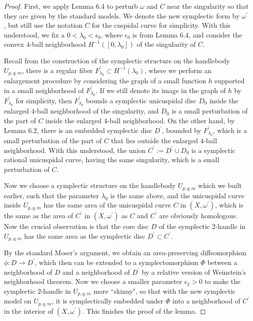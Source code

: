 \documentclass[11pt]{amsart}
\theoremstyle{plain}
\numberwithin{theorem}{section}
\theoremstyle{definition}
\begin{document}
\begin{proof}
First, we apply Lemma 6.4 to perturb $\omega$ and $C$ near the singularity so that they are given by the standard models. We denote the new symplectic form by $\omega^\prime$, but still use the notation $C$ for the cuspidal curve for simplicity. With this understood, we fix a $0<\lambda_0<\epsilon_0$, where $\epsilon_0$ is from 
Lemma 6.4, and consider the convex $4$-ball neighborhood $H^{-1}([0,\lambda_0])$ of the singularity of $C$. 

Recall from the construction of the symplectic structure on the handlebody $U_{p,q,m}$, there is a regular fiber
$F^\prime_{\lambda_0}\subset H^{-1}(\lambda_0)$, where we perform an enlargement procedure by considering
the graph of a small function $h$ supported in a small neighborhood of $F^\prime_{\lambda_0}$. If we still denote
its image in the graph of $h$ by $F^\prime_{\lambda_0}$ for simplicity, then $F^\prime_{\lambda_0}$ bounds a
symplectic unicuspidal disc $D_0$ inside the enlarged $4$-ball neighborhood of the singularity, and $D_0$ is a small perturbation of the part of $C$ inside the enlarged $4$-ball neighborhood. On the other hand, by Lemma 6.2,
there is an embedded symplectic disc $D^\prime$, bounded by $F^\prime_{\lambda_0}$, which is a small perturbation of the part of $C$ that lies outside the enlarged $4$-ball neighborhood. With this understood, the union $C^\prime:=D^\prime\cup D_0$ is a symplectic rational unicuspidal curve, having the same
singularity, which is a small perturbation of $C$. 

Now we choose a symplectic structure on the handlebody $U_{p,q,m}$ which we built earlier, such that the parameter $\lambda_0$ is the same above, and the unicuspidal curve inside $U_{p,q,m}$ has the same area of
the unicuspidal curve $C$ in $(X,\omega^\prime)$, which is the same as the area of $C^\prime$ in 
$(X,\omega^\prime)$ as $C$ and $C^\prime$ are obviously homologous. Now the crucial observation is that the core disc $D$ of the symplectic $2$-handle in $U_{p,q,m}$ has the same area as the symplectic disc $D^\prime\subset C^\prime$.

By the standard Moser's argument, we obtain an area-preserving diffeomorphism $\phi: D\rightarrow D^\prime$, 
which then can be extended to a symplectomorphism $\Phi$ between a neighborhood of $D$ and a neighborhood of $D^\prime$ by a relative version of Weinstein's neighborhood theorem. 
Now we choose a smaller parameter $\epsilon_2>0$ 
to make the symplectic $2$-handle in $U_{p,q,m}$ more ``skinny", so that with the new symplectic model on $U_{p,q,m}$, it is symplectically embedded under $\Phi$ into a neighborhood of $C^\prime$ in the interior of 
$(X,\omega^\prime)$. This finishes the proof of the lemma.

\end{proof}
\end{document}
